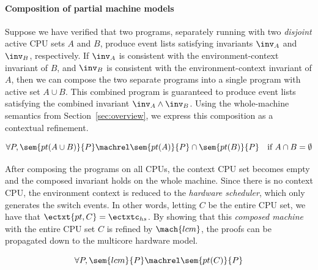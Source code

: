 \paragraph{Composition of partial machine models}
Suppose we have verified that two programs, separately running with
two \emph{disjoint} active CPU sets $A$ and $B$, produce event lists
satisfying invariants $\inv_A$ and $\inv_B$, respectively.  If
$\inv_A$ is consistent with the environment-context invariant of $B$,
and $\inv_B$ is consistent with the environment-context invariant of
$A$, then we can compose the two separate programs into a single
program with active set $A \cup B$.  This combined program is
guaranteed to produce event lists satisfying the combined invariant
$\inv_A \wedge \inv_B$. Using the whole-machine semantics
from Section~\ref{sec:overview}, we express this
composition as a contextual refinement.

\begin{lemma}\vspace{-2pt}
\label{lemma:compose}
\[\forall P, \sem{pt(A\cup B)}{P}\machrel \sem{pt(A)}{P} \cap \sem{pt(B)}{P}\quad \text{if } A \cap B = \emptyset\]
\ignore{
\[
\begin{array}{l}
\forall \oracle_{A}\  \oracle_{B}\
\oracle_{\overline{A\cup B}},\\
(\mach{pt},
\oracle_{\overline{A\cup B}})_{A\cup B}
= (\mach{pt},
\oracle_B
\cup \oracle_{\overline{A\cup B}})_A \bigcap
(\mach{pt},
\oracle_A \cup \oracle_{\overline{A\cup B}})_B
\end{array}
\]
}
\end{lemma}
After composing the programs on all CPUs, the context CPU set becomes
empty and the composed invariant holds on the whole machine.
Since there is no context CPU, the environment context is
reduced to the \emph{hardware scheduler}, which only generates the
switch events. In other words, letting $C$ be the entire CPU set, we have that $\ectxt{pt,C} = \ectxtc_{hs}$.  By
showing that this \emph{composed machine} with the entire CPU set $C$
is refined by $\mach{lcm}$, the proofs can be propagated down to the
multicore hardware model. 

\begin{lemma}
\[\forall P, \sem{lcm}{P}\machrel \sem{pt(C)}{P}\]
\end{lemma}


